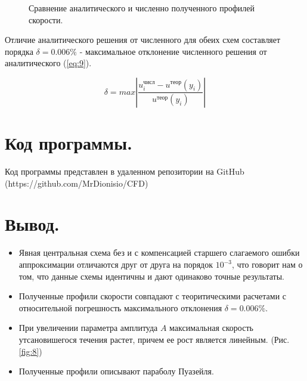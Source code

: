 \begin{figure}[H]
    \centering
    \hfill 
    \caption{Сравнение аналитического и численно полученного профилей скорости.}
    \label{fig:9}
\end{figure}

Отличие аналитического решения от численного для обеих схем составляет порядка $\delta = 0.006\%$ - максимальное отклонение численного решения от аналитического (\ref{eq:9}).

\begin{equation}
    \delta = max\left| \frac{u_i^\text{числ}-u^\text{теор}(y_i)}{u^\text{теор}(y_i)}\right|
\label{eq:9}
\end{equation}

\section{Код программы.}
Код программы представлен в удаленном репозитории на GitHub \\ (https://github.com/MrDionisio/CFD)



\section{Вывод.}
\begin{itemize}
    \item Явная центральная схема без и с компенсацией старшего слагаемого ошибки аппроксимации отличаются друг от друга на порядок $10^{-3}$, что говорит нам о том, что данные схемы идентичны и дают одинаково точные результаты.
    \item Полученные профили скорости совпадают с теоритическими расчетами с относительной погрешность максимального отклонения $\delta = 0.006\%$.
    \item При увеличении параметра амплитуда $A$ максимальная скорость утсановишегося течения растет, причем ее рост является линейным. (Рис. \ref{fig:8})
    \item Полученные профили описывают параболу Пуазейля.
    
\end{itemize}